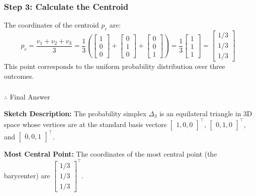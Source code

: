\documentclass{article}
\begin{document}
\subsubsection*{Step 3: Calculate the Centroid}
\parbox{\textwidth}{The coordinates of the centroid $p_c$ are:
$$ p_c = \frac{v_1 + v_2 + v_3}{3} = \frac{1}{3} \left( \begin{bmatrix} 1 \\ 0 \\ 0 \end{bmatrix} + \begin{bmatrix} 0 \\ 1 \\ 0 \end{bmatrix} + \begin{bmatrix} 0 \\ 0 \\ 1 \end{bmatrix} \right) = \frac{1}{3} \begin{bmatrix} 1 \\ 1 \\ 1 \end{bmatrix} = \begin{bmatrix} 1/3 \\ 1/3 \\ 1/3 \end{bmatrix} $$
This point corresponds to the uniform probability distribution over three outcomes.}

\subsubsection*{\normalfont}{$\therefore$ Final Answer}\\
\parbox{\textwidth}{\textbf{Sketch Description:} The probability simplex $\Delta_3$ is an equilateral triangle in 3D space whose vertices are at the standard basis vectors $\begin{bmatrix} 1, 0, 0 \end{bmatrix}^\top$, $\begin{bmatrix} 0, 1, 0 \end{bmatrix}^\top$, and $\begin{bmatrix} 0, 0, 1 \end{bmatrix}^\top$.

\textbf{Most Central Point:} The coordinates of the most central point (the barycenter) are $\begin{bmatrix} 1/3 \\ 1/3 \\ 1/3 \end{bmatrix}^\top$.}
\end{document}
